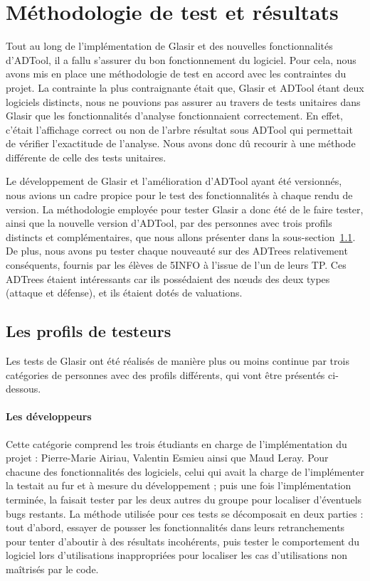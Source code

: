 \section{Méthodologie de test et résultats}
\label{sec:cr_tests}

Tout au long de l'implémentation de Glasir et des nouvelles fonctionnalités d'ADTool, il a fallu s'assurer du bon fonctionnement du logiciel. Pour cela, nous avons mis en place une méthodologie de test en accord avec les contraintes du projet. La contrainte la plus contraignante était que, Glasir et ADTool étant deux logiciels distincts, nous ne pouvions pas assurer au travers de tests unitaires dans Glasir que les fonctionnalités d'analyse fonctionnaient correctement. En effet, c'était l'affichage correct ou non de l'arbre résultat sous ADTool qui permettait de vérifier l'exactitude de l'analyse. Nous avons donc dû recourir à une méthode différente de celle des tests unitaires.

Le développement de Glasir et l'amélioration d'ADTool ayant été versionnés, nous avions un cadre propice pour le test des fonctionnalités à chaque rendu de version. La méthodologie employée pour tester Glasir a donc été de le faire tester, ainsi que la nouvelle version d'ADTool, par des personnes avec trois profils distincts et complémentaires, que nous allons présenter dans la {\sc sous-section}~\ref{subsec:testeurs}. De plus, nous avons pu tester chaque nouveauté sur des ADTrees relativement conséquents, fournis par les élèves de 5INFO à l'issue de l'un de leurs TP. Ces ADTrees étaient intéressants car ils possédaient des n\oe{}uds des deux types (attaque et défense), et ils étaient dotés de valuations.

\subsection{Les profils de testeurs}
\label{subsec:testeurs}

Les tests de Glasir ont été réalisés de manière plus ou moins continue par trois catégories de personnes avec des profils différents, qui vont être présentés ci-dessous.

\paragraph{Les développeurs} Cette catégorie comprend les trois étudiants en charge de l'implémentation du projet : Pierre-Marie {\sc Airiau}, Valentin {\sc Esmieu} ainsi que Maud {\sc Leray}. Pour chacune des fonctionnalités des logiciels, celui qui avait la charge de l'implémenter la testait au fur et à mesure du développement ; puis une fois l'implémentation terminée, la faisait tester par les deux autres du groupe pour localiser d'éventuels \og bugs \fg{} restants. La méthode utilisée pour ces tests se décomposait en deux parties : tout d'abord, essayer de pousser les fonctionnalités dans leurs retranchements pour tenter d'aboutir à des résultats incohérents, puis tester le comportement du logiciel lors d'utilisations inappropriées pour localiser les cas d'utilisations non maîtrisés par le code.


